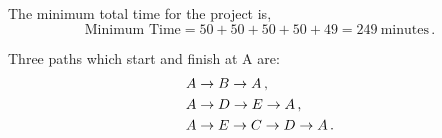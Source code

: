 \begin{subquestions}
\begin{subsubquestions}
The minimum total time for the project is,
\begin{equation}
	\text{Minimum Time} = 50+50+50+50+49 = 249 ~\text{minutes}\,.
\end{equation}

\end{subsubquestions}


\subquestion

Three paths which start and finish at A are:
\begin{align}
	& A \rightarrow B \rightarrow A \,, \nonumber \\
	& A \rightarrow D \rightarrow E \rightarrow A \,, \nonumber \\
	& A \rightarrow E \rightarrow C \rightarrow D \rightarrow A \,.
\end{align}

\end{subquestions}
